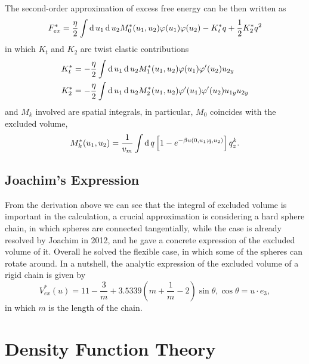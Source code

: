 The second-order approximation of excess free energy can be then written as
\begin{equation}
	F_{ex}^*=\frac{\eta}{2}\int\operatorname{d}u_1\operatorname{d}u_2M_0^*(u_1,u_2)\varphi(u_1)\varphi(u_2)-K_t^*q+\frac{1}{2}K_2^*q^2
\end{equation}
in which $K_t$ and $K_2$ are twist elastic contributions
\begin{equation}
	\begin{split}
		K_t^*&=-\frac{\eta}{2}\int\operatorname{d}u_1\operatorname{d}u_2M_1^*(u_1,u_2)\varphi(u_1)\varphi'(u_2)u_{2y}\\
		K_2^*&=-\frac{\eta}{2}\int\operatorname{d}u_1\operatorname{d}u_2M_2^*(u_1,u_2)\varphi'(u_1)\varphi'(u_2)u_{1y}u_{2y}
	\end{split}
\end{equation}
and $M_k$ involved are spatial integrals, in particular, $M_0$ coincides with the excluded volume,
\begin{equation}\label{Eqn:Mk}
	M_k^*(u_1,u_2)=\frac{1}{v_m}\int\operatorname{d}q \left[1-e^{-\beta u(0,u_1;q,u_2)}\right]q_z^k.
\end{equation}

\subsection{Joachim's Expression}\label{Sec:Joachim}

From the derivation above we can see that the integral of excluded volume is important in the calculation, a crucial approximation is considering a hard sphere chain, in which spheres are connected tangentially, while the case is already resolved by Joachim in 2012, and he gave a concrete expression of the excluded volume of it. Overall he solved the flexible case, in which some of the spheres can rotate around. In a nutshell, the analytic expression of the excluded volume of a rigid chain is given by
\begin{equation}\label{Eqn:Joachim}
	V_{ex}^*(u)=11-\frac{3}{m}+3.5339(m+\frac{1}{m}-2)\sin\theta,  \cos\theta=u\cdot e_3,
\end{equation}
in which $m$ is the length of the chain.



\section{Density Function Theory}\label{Sec:DFT}
